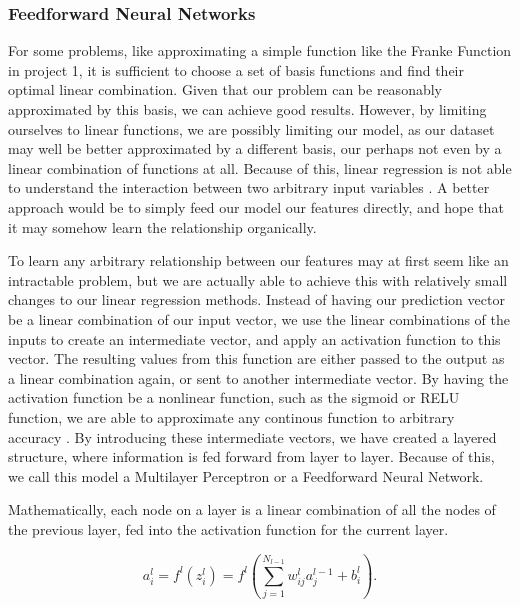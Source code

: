 \documentclass[onecolumn,10pt,cleanfoot]{asme2ej}
\begin{document}
\subsubsection{Feedforward Neural Networks}

For some problems, like approximating a simple function like the Franke Function in project 1, it is sufficient to choose a set of basis functions and find their optimal linear combination. Given that our problem can be reasonably approximated by this basis, we can achieve good results. However, by limiting ourselves to linear functions, we are possibly limiting our model, as our dataset may well be better approximated by a different basis, our perhaps not even by a linear combination of functions at all. Because of this, linear regression is not able to understand the interaction between two arbitrary input variables \cite[165]{gbc}. A better approach would be to simply feed our model our features directly, and hope that it may somehow learn the relationship organically.

To learn any arbitrary relationship between our features may at first seem like an intractable problem, but we are actually able to achieve this with relatively small changes to our linear regression methods. Instead of having our prediction vector be a linear combination of our input vector, we use the linear combinations of the inputs to create an intermediate vector, and apply an activation function to this vector. The resulting values from this function are either passed to the output as a linear combination again, or sent to another intermediate vector. By having the activation function be a nonlinear function, such as the sigmoid or RELU function, we are able to approximate any continous function to arbitrary accuracy \cite[230]{cmb}. By introducing these intermediate vectors, we have created a layered structure, where information is fed forward from layer to layer. Because of this, we call this model a Multilayer Perceptron or a Feedforward Neural Network.

Mathematically, each node on a layer is a linear combination of all the nodes of the previous layer, fed into the activation function for the current layer.

\begin{equation}
a_i^l = f^l(z_i^l) = f^l\left(\sum_{j=1}^{N_{l-1}} w_{ij}^l a_j^{l-1} + b_i^l\right).
\end{equation}

%
%
\end{document}
